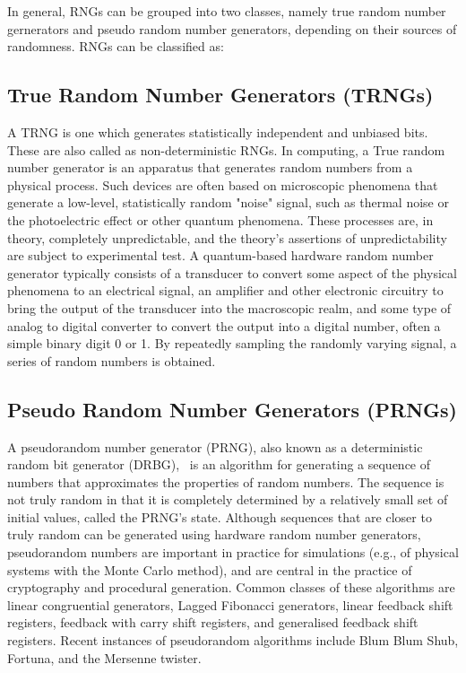 In general, RNGs can be grouped into two classes, namely true random number gernerators and pseudo random number generators, depending on their sources of randomness. 
RNGs can be classified as:
\subsection{True Random Number Generators (TRNGs)}
A TRNG is one which generates statistically independent and unbiased bits. These are also
called as non-deterministic RNGs. In computing, a True random number generator is an apparatus that generates random numbers from a physical process. Such devices are often based on microscopic phenomena that generate a low-level, statistically random "noise" signal, such as thermal noise or the photoelectric effect or other quantum phenomena. These processes are, in theory, completely unpredictable, and the theory's assertions of unpredictability are subject to experimental test. A quantum-based hardware random number generator typically consists of a transducer to convert some aspect of the physical phenomena to an electrical signal, an amplifier and other electronic circuitry to bring the output of the transducer into the macroscopic realm, and some type of analog to digital converter to convert the output into a digital number, often a simple binary digit 0 or 1. By repeatedly sampling the randomly varying signal, a series of random numbers is obtained.

\subsection{Pseudo Random Number Generators (PRNGs)}
A pseudorandom number generator (PRNG), also known as a deterministic random bit generator (DRBG),~\cite{Barker05recommendationfor} is an algorithm for generating a sequence of numbers that approximates the properties of random numbers. The sequence is not truly random in that it is completely determined by a relatively small set of initial values, called the PRNG's state. Although sequences that are closer to truly random can be generated using hardware random number generators, pseudorandom numbers are important in practice for simulations (e.g., of physical systems with the Monte Carlo method), and are central in the practice of cryptography and procedural generation. Common classes of these algorithms are linear congruential generators, Lagged Fibonacci generators, linear feedback shift registers, feedback with carry shift registers, and generalised feedback shift registers. Recent instances of pseudorandom algorithms include Blum Blum Shub, Fortuna, and the Mersenne twister.


